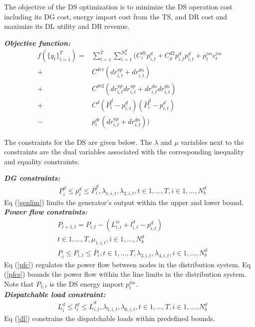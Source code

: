 The objective of the DS optimization is to minimize the DS operation cost including its DG cost,  energy import cost from the TS, and DR cost and maximize its DL utility and DR revenue.

\textbf{\emph{Objective function:} }
\begin{align*}
f(\{y_t\}^{T}_{t=1}) =& \sum_{t=1}^{T}\sum_{i=1}^{N^d_b}(C^{d1}_i p^d_{i,t} +C^{d2}_g p^d_{i,t}  p^d_{i,t} +p^{im}_{t}c^{im}_{t}\\
+ &C^{dr1} (dr^{up}_{i,t} + dr^{dn}_{i,t} ) \\
+ &C^{dr2} (dr^{up}_{i,t}dr^{up}_{i,t} + dr^{dn}_{i,t}dr^{dn}_{i,t}  ) \\
+ &C^{d}(\overline{P}^d_{i}-p^d_{i,t})(\overline{P}^d_{i}-p^d_{i,t})\\
- &p^{dr}_{t}(dr_{i,t}^{up}+dr_{i,t}^{dn}))
\end{align*}

The constraints for the DS are given below. The $\lambda$ and $\mu$ variables next to the constraints are the dual variables associated with the corresponding inequality and equality constraints.

\textbf{\emph{DG constraints:} }
\begin{align}
&\underline P^d_{i}\leq p^d_{i}\leq  \overline P^d_{i}\label{genlim}, \lambda_{1,i,t},\lambda_{2,i,t},t\in{1,...,T} ,i\in{1,...,N_b^d} 
\end{align}
Eq (\ref{genlim}) limits the generator's output within the upper and lower bound.\\

\textbf{\emph{Power flow constraints:} }
\begin{align}
& P_{i+1,t} = P_{i,t} - (L^{ie}_{i,t} + l^d_{i,t} - p^d_{i,t}) \nonumber\\
& t\in{1,...,T} ,\mu_{1,i,t},i\in{1,...,N_b^d}  \label{pfc}\\
&  \underline P_{i} \leq P_{i,t} \leq  \overline P_{i}, t\in{1,...,T}, \lambda_{3,i,t},\lambda_{4,i,t}, i\in{1,...,N_b^d}\label{pfcs}
\end{align}
Eq (\ref{pfc}) regulates the power flow between nodes in the distribution system. Eq (\ref{pfcs}) bounds the power flow within the line limits in the distribution system. Note that $P_{1,t}$ is the DS energy import $p^{im}_t$. \\

\textbf{\emph{Dispatchable load constraint:} }
\begin{align}
&\underline{L}^d_{i}\leq l^d_{i}\leq \overline{L}^d_{i,t}\label{dl}, \lambda_{5,i,t},\lambda_{6,i,t},t\in{1,...,T},i\in{1,...,N_b^d} 
\end{align} 
Eq (\ref{dl}) constrains the dispatchable loads within predefined bounds. 

